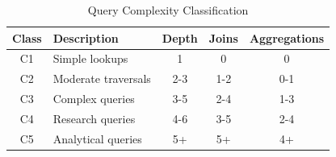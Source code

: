 
\begin{table}[htbp]
\centering
\caption{Query Complexity Classification}
\label{tab:query_classification}
\begin{tabular}{|c|l|c|c|c|}
\hline
\textbf{Class} & \textbf{Description} & \textbf{Depth} & \textbf{Joins} & \textbf{Aggregations} \\
\hline
C1 & Simple lookups & 1 & 0 & 0 \\
C2 & Moderate traversals & 2-3 & 1-2 & 0-1 \\
C3 & Complex queries & 3-5 & 2-4 & 1-3 \\
C4 & Research queries & 4-6 & 3-5 & 2-4 \\
C5 & Analytical queries & 5+ & 5+ & 4+ \\
\hline
\end{tabular}
\end{table}

